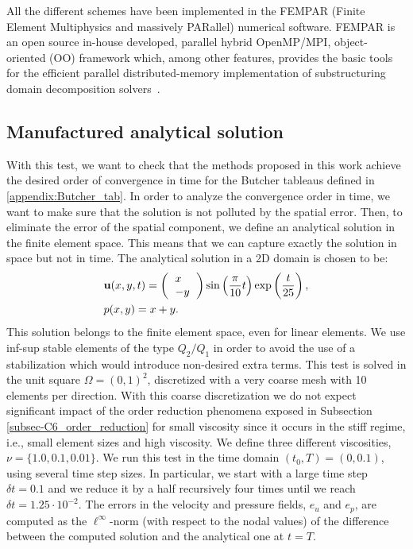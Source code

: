 All the different schemes have been implemented in the FEMPAR (Finite Element Multiphysics and massively PARallel)  numerical software. FEMPAR is an open source in-house developed, parallel hybrid OpenMP/MPI, object-oriented (OO) framework which, among other features, provides the basic tools for the efficient  parallel distributed-memory implementation  of substructuring domain decomposition solvers~\cite{badia_implementation_2013,art003}.

\subsection{Manufactured analytical solution}
\label{subsec-C6_manufactured}

With this test, we want to check that the methods proposed in this work achieve the desired order of convergence in time for the Butcher tableaus defined in \ref{appendix:Butcher_tab}. In order to analyze the convergence order in time, we want to make sure that the solution is not polluted by the spatial error. Then, to eliminate the error of the spatial component, we define an analytical solution in the finite element space. This means that we can capture exactly the solution in space but not in time. The analytical solution in a 2D domain is chosen to be:
\begin{align}
\label{eq-C6_analytical_u}
&\u(x,y,t) = \left( \begin{tabular}{l}
$x$\\
$-y$
\end{tabular}\right)\sin\left(\frac{\pi}{10}t\right)\exp\left(\frac{t}{25}\right),\\
\label{eq-C6_analytical_p}
&p(x,y) = x+y.
\end{align}
This solution belongs to the finite element space, even for linear elements. We use inf-sup stable elements of the type $Q_2/Q_1$ in order to avoid the use of a stabilization which would introduce non-desired extra terms.  This test is solved in the unit square $\Omega=(0,1)^2$, discretized with a very coarse mesh with 10 elements per direction. With this coarse discretization we do not expect significant impact of the order reduction phenomena exposed in Subsection \ref{subsec-C6_order_reduction} for small viscosity since it occurs in the stiff regime, i.e.,  small element sizes and high viscosity. We define three different viscosities, $\nu=\{1.0,0.1,0.01\}$. We run this test in the time domain $(t_0,T) = (0,0.1)$, using several time step sizes. In particular, we start with a large time step $\delta t=0.1$ and we reduce it by a half recursively four times until we reach $\delta t=1.25\cdot10^{-2}$. The errors in the velocity and pressure fields, $e_u$ and $e_p$, are computed as the $\ell^\infty$-norm (with respect to the nodal values) of the difference between the computed solution and the analytical one at $t=T$. %
